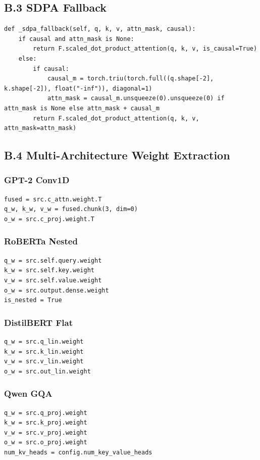 \subsection{B.3 SDPA Fallback}

\begin{lstlisting}
def _sdpa_fallback(self, q, k, v, attn_mask, causal):
    if causal and attn_mask is None:
        return F.scaled_dot_product_attention(q, k, v, is_causal=True)
    else:
        if causal:
            causal_m = torch.triu(torch.full((q.shape[-2], k.shape[-2]), float("-inf")), diagonal=1)
            attn_mask = causal_m.unsqueeze(0).unsqueeze(0) if attn_mask is None else attn_mask + causal_m
        return F.scaled_dot_product_attention(q, k, v, attn_mask=attn_mask)
\end{lstlisting}

\subsection{B.4 Multi-Architecture Weight Extraction}

\subsubsection{GPT-2 Conv1D}
\begin{lstlisting}
fused = src.c_attn.weight.T
q_w, k_w, v_w = fused.chunk(3, dim=0)
o_w = src.c_proj.weight.T
\end{lstlisting}

\subsubsection{RoBERTa Nested}
\begin{lstlisting}
q_w = src.self.query.weight
k_w = src.self.key.weight
v_w = src.self.value.weight
o_w = src.output.dense.weight
is_nested = True
\end{lstlisting}

\subsubsection{DistilBERT Flat}
\begin{lstlisting}
q_w = src.q_lin.weight
k_w = src.k_lin.weight
v_w = src.v_lin.weight
o_w = src.out_lin.weight
\end{lstlisting}

\subsubsection{Qwen GQA}
\begin{lstlisting}
q_w = src.q_proj.weight
k_w = src.k_proj.weight
v_w = src.v_proj.weight
o_w = src.o_proj.weight
num_kv_heads = config.num_key_value_heads
\end{lstlisting}

